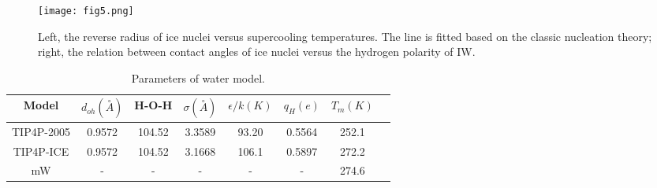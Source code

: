\documentclass[aps,prl,twocolumn,superscriptaddress]{revtex4-1}
\begin{document}
\begin{figure}[ht]
  \centering
\texttt{[image: fig5.png]}
\caption{ Left, the reverse radius of ice nuclei versus supercooling temperatures. The line is fitted based on the classic nucleation theory; right, the relation between contact angles of ice nuclei versus the hydrogen polarity of IW. 
\label{fig:fig5} 
}
\end{figure}

\begin{table}
\caption{Parameters of water model.}
\centering{}%
\begin{tabular}{cccccccc}
\hline
{Model} & {$d_{oh}(\overset{\circ}{A})$} & { H-O-H}  & {$\sigma (\overset{\circ}{A})$}  & {$\epsilon/k (K)$} & {$q_H(e)$} & {  $T_m (K)$} 
\tabularnewline
\hline

{ TIP4P-2005} & { 0.9572} & {104.52}  & {3.3589}  & {93.20} & {0.5564} & {252.1} \tabularnewline
{ TIP4P-ICE} & { 0.9572} & {104.52}  & {3.1668}  & {106.1} & {0.5897} & {272.2} \tabularnewline
	{ mW} & { -} & {-}  & {-}  & {-} & {-} & {274.6}  \tabularnewline
\hline
\end{tabular}
\label{table:water model}
\end{table}



\end{document}
